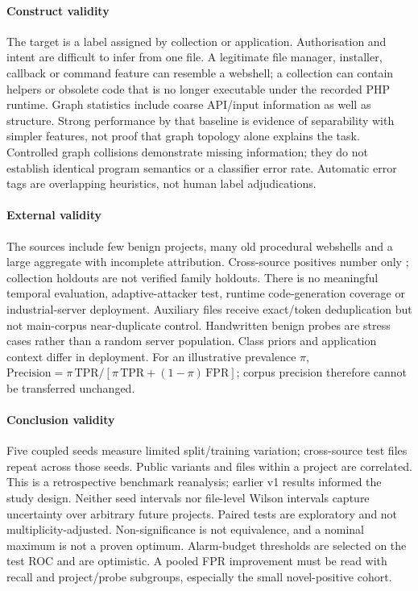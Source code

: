\paragraph{Construct validity}
The target is a label assigned by collection or application. Authorisation and intent are difficult to infer
from one file. A legitimate file manager, installer, callback or command feature can resemble a webshell;
a collection can contain helpers or obsolete code that is no longer executable under the recorded PHP runtime.
Graph statistics include coarse API/input information as well as structure. Strong performance by that baseline
is evidence of separability with simpler features, not proof that graph topology alone explains the task.
Controlled graph collisions demonstrate missing information; they do not establish identical program semantics
or a classifier error rate. Automatic error tags are overlapping heuristics, not human label adjudications.

\paragraph{External validity}
The sources include few benign projects, many old procedural webshells and a large aggregate with incomplete
attribution. Cross-source positives number only ; collection holdouts are not
verified family holdouts. There is no meaningful temporal evaluation, adaptive-attacker test, runtime code-generation
coverage or industrial-server deployment. Auxiliary files receive exact/token deduplication but not main-corpus
near-duplicate control. Handwritten benign probes are stress cases rather than a random server population.
Class priors and application context differ in deployment. For an illustrative prevalence $\pi$,
$\mathrm{Precision}=\pi\,\mathrm{TPR}/[\pi\,\mathrm{TPR}+(1-\pi)\,\mathrm{FPR}]$;
corpus precision therefore cannot be transferred unchanged.

\paragraph{Conclusion validity}
Five coupled seeds measure limited split/training variation; cross-source test files repeat across those seeds.
Public variants and files within a project are correlated. This is a retrospective benchmark reanalysis; earlier v1 results informed the study design.
Neither seed intervals nor file-level Wilson intervals
capture uncertainty over arbitrary future projects. Paired tests are exploratory and not multiplicity-adjusted.
Non-significance is not equivalence, and a nominal maximum is not a proven optimum.
Alarm-budget thresholds are selected on the test ROC and are optimistic. A pooled FPR improvement must be read
with recall and project/probe subgroups, especially the small novel-positive cohort.

